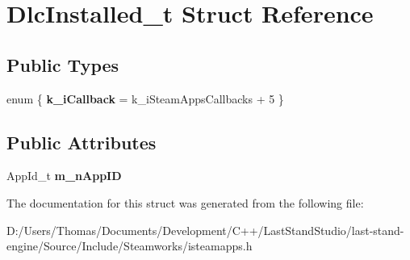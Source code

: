 \hypertarget{structDlcInstalled__t}{}\section{Dlc\+Installed\+\_\+t Struct Reference}
\label{structDlcInstalled__t}
\subsection*{Public Types}
\begin{DoxyCompactItemize}
\item 
\hypertarget{structDlcInstalled__t_a92598f8ea0cd96b5e92fbf4cd3dc6ed2}{}enum \{ {\bfseries k\+\_\+i\+Callback} = k\+\_\+i\+Steam\+Apps\+Callbacks + 5
 \}\label{structDlcInstalled__t_a92598f8ea0cd96b5e92fbf4cd3dc6ed2}

\end{DoxyCompactItemize}
\subsection*{Public Attributes}
\begin{DoxyCompactItemize}
\item 
\hypertarget{structDlcInstalled__t_aebd2a32fcef8ea6578467987ec323d72}{}App\+Id\+\_\+t {\bfseries m\+\_\+n\+App\+I\+D}\label{structDlcInstalled__t_aebd2a32fcef8ea6578467987ec323d72}

\end{DoxyCompactItemize}


The documentation for this struct was generated from the following file\+:\begin{DoxyCompactItemize}
\item 
D\+:/\+Users/\+Thomas/\+Documents/\+Development/\+C++/\+Last\+Stand\+Studio/last-\/stand-\/engine/\+Source/\+Include/\+Steamworks/isteamapps.\+h\end{DoxyCompactItemize}

